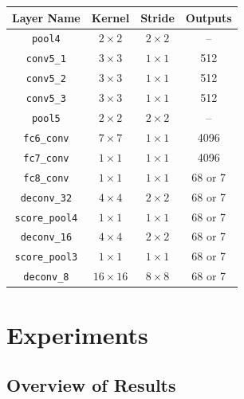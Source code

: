 \begin{table}
\begin{tabular}{|c|c|c|c|}
\hline
\end{tabular}
\begin{tabular}{|c|c|c|c|}
\hline
Layer Name           & Kernel       & Stride       &  Outputs  \\
\hline\hline
\texttt{pool4}       & $2 \times 2$ & $2 \times 2$ & --   \\
\texttt{conv5\_1}    & $3 \times 3$ & $1 \times 1$ & 512  \\
\texttt{conv5\_2}    & $3 \times 3$ & $1 \times 1$ & 512  \\
\texttt{conv5\_3}    & $3 \times 3$ & $1 \times 1$ & 512  \\
\texttt{pool5}       & $2 \times 2$ & $2 \times 2$ & --   \\
\texttt{fc6\_conv}   & $7 \times 7$ & $1 \times 1$ & 4096 \\
\texttt{fc7\_conv}   & $1 \times 1$ & $1 \times 1$ & 4096 \\
\texttt{fc8\_conv}   & $1 \times 1$ & $1 \times 1$ & 68 or 7 \\
\texttt{deconv\_32}   & $4 \times 4$ & $2 \times 2$ & 68 or 7 \\
\texttt{score\_pool4} & $1 \times 1$ & $1 \times 1$ & 68 or 7 \\
\texttt{deconv\_16}   & $4 \times 4$ & $2 \times 2$ & 68 or 7 \\
\texttt{score\_pool3} & $1 \times 1$ & $1 \times 1$ & 68 or 7 \\
\texttt{deconv\_8}    & $16 \times 16$ & $8 \times 8$ & 68 or 7 \\
\hline
\end{tabular}
\end{table}


\section{Experiments}

\subsection{Overview of Results}

